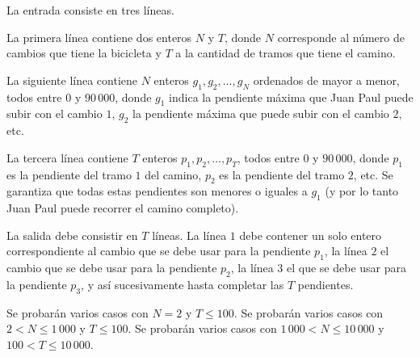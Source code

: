 \documentclass{oci}
\begin{document}
\begin{inputDescription}
La entrada consiste en tres líneas.

La primera línea contiene dos enteros $N$ y $T$, donde $N$ corresponde
al número de cambios que tiene la bicicleta y $T$ a la cantidad
de tramos que tiene el camino.

La siguiente línea contiene $N$ enteros $g_1,g_2,\ldots, g_N$ ordenados de mayor
a menor, todos entre $0$ y $90\,000$, donde $g_1$ indica la pendiente máxima que
Juan Paul puede subir con el cambio $1$, $g_2$ la pendiente máxima que puede
subir con el cambio $2$, etc.

La tercera línea contiene $T$ enteros $p_1,p_2,\ldots,p_T$, todos entre $0$ y $90\,000$, 
donde $p_1$ es la pendiente del tramo $1$ del camino, $p_2$ es la pendiente
del tramo $2$, etc.
Se garantiza que todas estas pendientes son menores o iguales a $g_1$ (y por lo tanto Juan Paul
puede recorrer el camino completo).
\end{inputDescription}

\begin{outputDescription}
La salida debe consistir en $T$ líneas.
La línea $1$ debe contener un solo entero correspondiente al cambio que se debe usar para la pendiente $p_1$,
la línea $2$ el cambio que se debe usar para la pendiente $p_2$, la línea $3$ el que se debe usar 
para la pendiente $p_3$, y así sucesivamente hasta completar las $T$ pendientes.
\end{outputDescription}

\begin{scoreDescription}
   Se probarán varios casos con $N=2$ y $T\leq 100$.
   Se probarán varios casos con $2 < N \leq 1\,000$ y $T\leq 100$.
   Se probarán varios casos con $1\,000< N \leq 10\,000$ y $100 <
  T\leq 10\,000$.
\end{scoreDescription}

\begin{sampleDescription}
\end{sampleDescription}
\end{document}

